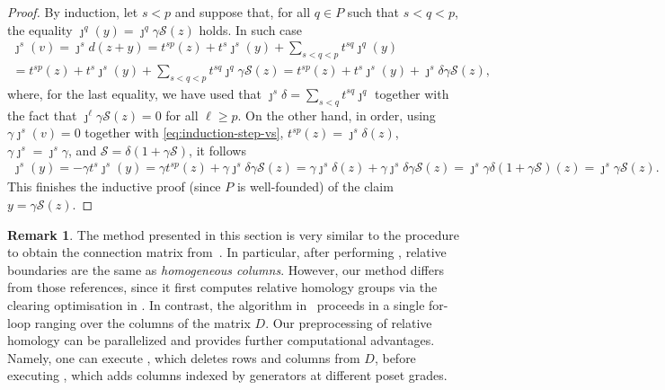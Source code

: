 \documentclass[11pt, table, nothms]{amsart}
\theoremstyle{definition}
\newtheorem{remark}[theorem]{Remark}
\newcommand{\cS}{\mathcal{S}}
\begin{document}
{\begin{proof}
    By induction, let $s < p$ and suppose that, for all $q \in P$ such that $s<q<p$, the equality $\jmath^q(y)=\jmath^q \gamma\cS(z)$ holds. 
    In such case
    \begin{multline}\label{eq:induction-step-vs}
    \jmath^s(v) = \jmath^s d(z + y) =
    t^{sp}(z) + t^s\jmath^s(y) + \sum_{s<q<p}t^{sq}\jmath^q(y) \\
    = t^{sp}(z) + t^s\jmath^s(y) + \sum_{s<q<p}t^{sq}\jmath^q \gamma\cS(z) 
    = t^{sp}(z) + t^s\jmath^s(y) + \jmath^s \delta \gamma\cS(z),
    \end{multline}
    where, for the last equality, we have used that $\jmath^s \delta = \sum_{s<q}t^{sq} \jmath^q$ together with the fact that $\jmath^\ell \gamma\cS(z) =0$ for all $\ell \geq p$.
    On the other hand, in order, using $\gamma \jmath^s(v)=0$ together with \cref{eq:induction-step-vs}, $t^{sp}(z)=\jmath^s \delta(z)$, $\gamma\jmath^s=\jmath^s\gamma$, and $\cS=\delta(1 + \gamma\cS)$, it follows
    \begin{multline*}
    \jmath^s(y) = 
    - \gamma t^s\jmath^s(y) = 
    \gamma t^{sp}(z) + \gamma \jmath^s \delta\gamma\cS(z) = 
    \gamma \jmath^s \delta(z) +  \gamma \jmath^s \delta \gamma \cS(z)  =   
    \jmath^s \gamma \delta(1 + \gamma \cS)(z) = \jmath^s\gamma \cS(z).
    \end{multline*}
    This finishes the inductive proof (since $P$ is well-founded) of the claim $y=\gamma \cS(z)$.
\end{proof}

\begin{remark}
    The method presented in this section is very similar to the procedure to obtain the connection matrix from~\cite{Dey2024ComputingReductions, Dey2025ComputingDecomposition}. 
    In particular, after performing , relative boundaries are the same as \emph{homogeneous columns}.
    However, our method differs from those references, since it first computes relative homology groups via the clearing optimisation in . In contrast, the algorithm in~\cite{Dey2024ComputingReductions, Dey2025ComputingDecomposition} proceeds in a single for-loop ranging over the columns of the matrix $D$.
    Our preprocessing of relative homology can be parallelized and provides further computational advantages. 
    Namely, one can execute , which deletes rows and columns from $D$, before executing , which adds columns indexed by generators at different poset grades.
\end{remark}

}
\end{document}
